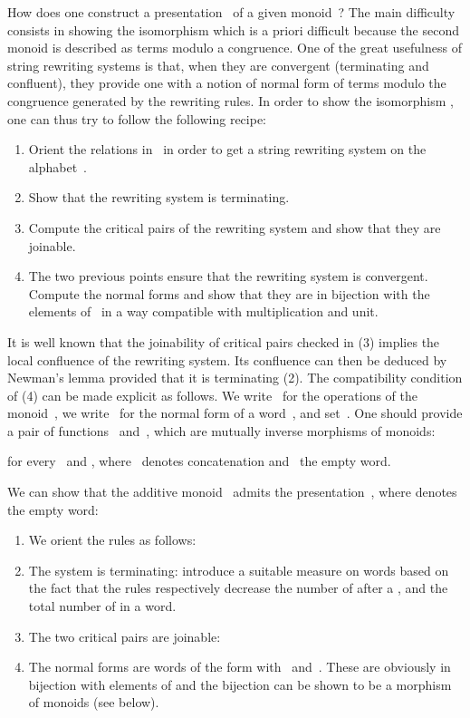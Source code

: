 \documentclass{LMCS}
\begin{document}
How does one construct a presentation~ of a given monoid~? The
main difficulty consists in showing the isomorphism
 which is a priori difficult because the second
monoid is described as terms modulo a congruence. One of the great usefulness of
string rewriting systems is that, when they are convergent (\ie terminating and
confluent), they provide one with a notion of normal form of terms modulo the
congruence generated by the rewriting rules. In order to show the isomorphism
, one can thus try to follow the following recipe:
\begin{enumerate}
\item Orient the relations in~ in order to get a string rewriting system on
  the alphabet~.
\item Show that the rewriting system is terminating.
\item Compute the critical pairs of the rewriting system and show that they are
  joinable.
\item The two previous points ensure that the rewriting system is
  convergent. Compute the normal forms and show that they are in bijection with
  the elements of~ in a way compatible with multiplication and unit.
\end{enumerate}
It is well known that the joinability of critical pairs checked in (3) implies
the local confluence of the rewriting system. Its confluence can then be deduced
by Newman's lemma provided that it is terminating (2). The compatibility
condition of (4) can be made explicit as follows. We write~ for
the operations of the monoid~, we write~ for the normal form of
a word~, and
set~. One should provide
a pair of functions~
and~, which are mutually inverse morphisms of
monoids:

for every~ and , where~ denotes concatenation
and~ the empty word.

\begin{exa}
  \label{ex:mon-pres}
  We can show that the additive monoid~ admits the
  presentation~, where  denotes the empty word:
  \begin{enumerate}
  \item We orient the rules as follows:
    
  \item The system is terminating: introduce a suitable measure on words based
    on the fact that the rules respectively decrease the number of  after a
    , and the total number of  in a word.
  \item The two critical pairs are joinable:
    
  \item The normal forms are words of the form  with~
    and~. These are obviously in bijection with elements of
     and the bijection can be shown to be a morphism of
    monoids (see below).
  \end{enumerate}
\end{exa}
\end{document}
